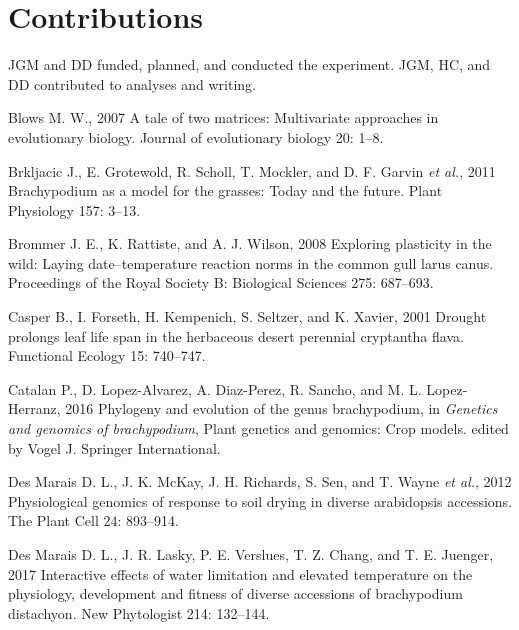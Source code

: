 \documentclass[jou,floatsintext]{apa6}
\begin{document}
\hypertarget{contributions}{%
\section{Contributions}\label{contributions}}

JGM and DD funded, planned, and conducted the experiment. JGM, HC, and DD contributed to analyses and writing.

\newpage

\begingroup
\setlength{\parindent}{-0.5in}
\setlength{\leftskip}{0.5in}

\hypertarget{refs}{}
\leavevmode\hypertarget{ref-blows2007tale}{}%
Blows M. W., 2007 A tale of two matrices: Multivariate approaches in evolutionary biology. Journal of evolutionary biology 20: 1--8.

\leavevmode\hypertarget{ref-brkljacic2011brachypodium}{}%
Brkljacic J., E. Grotewold, R. Scholl, T. Mockler, and D. F. Garvin \emph{et al.}, 2011 Brachypodium as a model for the grasses: Today and the future. Plant Physiology 157: 3--13.

\leavevmode\hypertarget{ref-brommer2008exploring}{}%
Brommer J. E., K. Rattiste, and A. J. Wilson, 2008 Exploring plasticity in the wild: Laying date--temperature reaction norms in the common gull larus canus. Proceedings of the Royal Society B: Biological Sciences 275: 687--693.

\leavevmode\hypertarget{ref-casper2001drought}{}%
Casper B., I. Forseth, H. Kempenich, S. Seltzer, and K. Xavier, 2001 Drought prolongs leaf life span in the herbaceous desert perennial cryptantha flava. Functional Ecology 15: 740--747.

\leavevmode\hypertarget{ref-catalan2016phylogeny}{}%
Catalan P., D. Lopez-Alvarez, A. Diaz-Perez, R. Sancho, and M. L. Lopez-Herranz, 2016 Phylogeny and evolution of the genus brachypodium, in \emph{Genetics and genomics of brachypodium}, Plant genetics and genomics: Crop models. edited by Vogel J. Springer International.

\leavevmode\hypertarget{ref-des2012physiological}{}%
Des Marais D. L., J. K. McKay, J. H. Richards, S. Sen, and T. Wayne \emph{et al.}, 2012 Physiological genomics of response to soil drying in diverse arabidopsis accessions. The Plant Cell 24: 893--914.

\leavevmode\hypertarget{ref-des2017interactive}{}%
Des Marais D. L., J. R. Lasky, P. E. Verslues, T. Z. Chang, and T. E. Juenger, 2017 Interactive effects of water limitation and elevated temperature on the physiology, development and fitness of diverse accessions of brachypodium distachyon. New Phytologist 214: 132--144.
\end{document}
